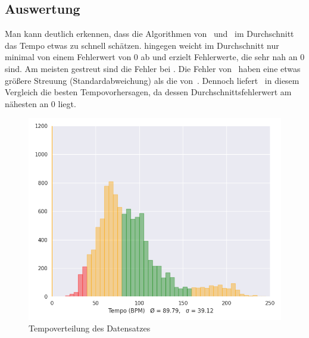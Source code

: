{{	}

	\subsection{Auswertung}
	{
		Man kann deutlich erkennen,
			dass die Algorithmen von~\cite{2001_BeatThis} und~\cite{2011_PlRoSt} im Durchschnitt das Tempo etwas zu schnell schätzen.
		\cite{2009_DaPlSt} hingegen weicht im Durchschnitt nur minimal von einem Fehlerwert von 0 ab
			und erzielt Fehlerwerte,
			die sehr nah an 0 sind.
		Am meisten gestreut sind die Fehler bei \cite{2001_BeatThis}.
		Die Fehler von~\cite{2009_DaPlSt} haben eine etwas grö{\ss}ere Streuung (Standardabweichung) als die von~\cite{2011_PlRoSt}.
		Dennoch liefert~\cite{2009_DaPlSt} in diesem Vergleich die besten Tempovorhersagen,
			da dessen Durchschnittsfehlerwert am nähesten an \num{0} liegt.

		\begin{figure}[h]
			\centering
			\includegraphics[scale=0.45]{resources/dataset_tempo_histogram.png}
			\caption{Tempoverteilung des Datensatzes}
			\label{fig:dataset_tempo}
		\end{figure}

}}
